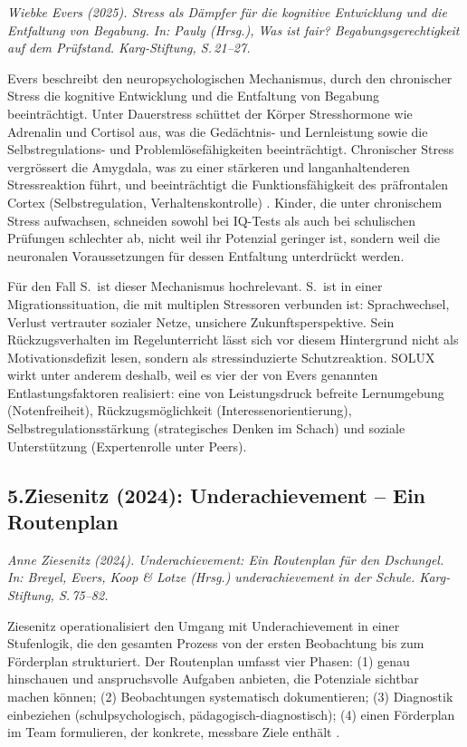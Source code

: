 \documentclass[ngerman, a4paper]{article}
\begin{document}
\textit{Wiebke Evers (2025). Stress als Dämpfer für die kognitive Entwicklung
  und die Entfaltung von Begabung. In: Pauly (Hrsg.), Was ist fair?
  Begabungsgerechtigkeit auf dem Prüfstand. Karg-Stiftung, S.\,21--27.}

\medskip
Evers beschreibt den neuropsychologischen Mechanismus, durch den chronischer
Stress die kognitive Entwicklung und die Entfaltung von Begabung beeinträchtigt.
Unter Dauerstress schüttet der Körper Stresshormone wie Adrenalin und Cortisol
aus, was die Gedächtnis- und Lernleistung sowie die Selbstregulations- und
Problemlösefähigkeiten beeinträchtigt. Chronischer Stress vergrössert die
Amygdala, was zu einer stärkeren und langanhaltenderen Stressreaktion führt,
und beeinträchtigt die Funktionsfähigkeit des präfrontalen Cortex
(Selbstregulation, Verhaltenskontrolle)
\parencite[S.\,22--23]{evers2025stress}. Kinder, die unter chronischem Stress
aufwachsen, schneiden sowohl bei IQ-Tests als auch bei schulischen Prüfungen
schlechter ab, nicht weil ihr Potenzial geringer ist, sondern weil die
neuronalen Voraussetzungen für dessen Entfaltung unterdrückt werden.

Für den Fall S.\ ist dieser Mechanismus hochrelevant. S.\ ist in einer
Migrationssituation, die mit multiplen Stressoren verbunden ist:
Sprachwechsel, Verlust vertrauter sozialer Netze, unsichere Zukunftsperspektive.
Sein Rückzugsverhalten im Regelunterricht lässt sich vor diesem Hintergrund
nicht als Motivationsdefizit lesen, sondern als stressinduzierte
Schutzreaktion. SOLUX wirkt unter anderem deshalb, weil es vier der von Evers
genannten Entlastungsfaktoren realisiert: eine von Leistungsdruck befreite
Lernumgebung (Notenfreiheit), Rückzugsmöglichkeit (Interessenorientierung),
Selbstregulationsstärkung (strategisches Denken im Schach) und soziale
Unterstützung (Expertenrolle unter Peers).


\subsection*{5.\quad Ziesenitz (2024): Underachievement -- Ein Routenplan}

\textit{Anne Ziesenitz (2024). Underachievement: Ein Routenplan für den
  Dschungel. In: Breyel, Evers, Koop \& Lotze (Hrsg.) underachievement
  in der Schule. Karg-Stiftung, S.\,75--82.}

\medskip
Ziesenitz operationalisiert den Umgang mit Underachievement in einer
Stufenlogik, die den gesamten Prozess von der ersten Beobachtung bis zum
Förderplan strukturiert. Der Routenplan umfasst vier Phasen: (1) genau
hinschauen und anspruchsvolle Aufgaben anbieten, die Potenziale sichtbar machen
können; (2) Beobachtungen systematisch dokumentieren; (3) Diagnostik
einbeziehen (schulpsychologisch, pädagogisch-diagnostisch); (4) einen
Förderplan im Team formulieren, der konkrete, messbare Ziele enthält
\parencite[S.\,75--80]{ziesenitz2024routenplan}.
\end{document}
